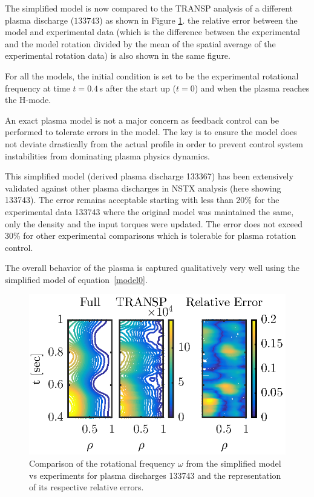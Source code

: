\documentclass[12pt]{iopart}
\begin{document}
The simplified model is now compared to the TRANSP analysis of a different plasma discharge ($133743$) as shown in Figure \ref{fig10}. the relative error between the model and experimental data (which is the difference between the experimental and the model rotation divided by the mean of the spatial average of the experimental rotation data) is also shown in  the same figure.

For all the models, the initial condition is set to be the experimental rotational frequency at  time $t=0.4$\,s after the start up ($t=0$) and when the plasma reaches the H-mode.

An exact plasma model is not a major concern as feedback control can be performed to tolerate errors in the model. The key is to ensure the model does not deviate drastically from the actual profile in order to prevent control system instabilities from dominating plasma physics dynamics.

This simplified model (derived plasma discharge 133367) has been extensively validated against other plasma discharges in NSTX analysis (here showing 133743). The error remains acceptable starting with less than 20\% for the  experimental data 133743 where the original model was maintained the same, only the density and the input torques were updated. The error does not exceed 30\% for other experimental comparisons which is tolerable for plasma rotation control.

The overall behavior of the plasma is captured qualitatively very well using the simplified model of equation~\ref{model0}. 

\begin{figure}
\includegraphics{imene_figs/fig10} %
\caption{Comparison of the rotational frequency $\omega$ from the simplified model vs experiments for plasma discharges 133743  and the representation of its respective relative errors.}
\label{fig10}
\end{figure}
\end{document}
